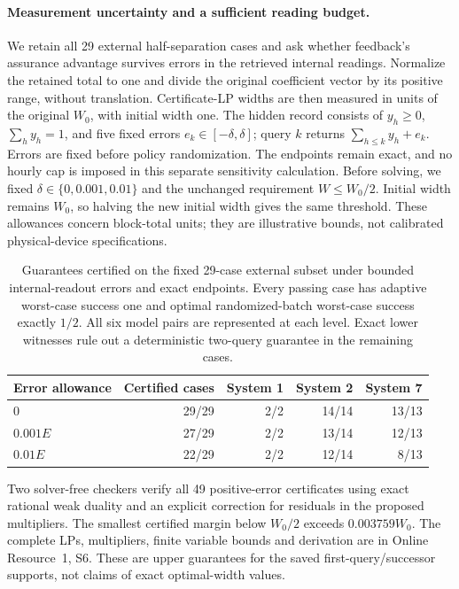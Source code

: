 \documentclass[12pt]{article}
\begin{document}
\FloatBarrier

\paragraph{Measurement uncertainty and a sufficient reading budget.}\label{sec:stored-error-sensitivity}
We retain all 29 external half-separation cases and ask whether feedback's
assurance advantage survives errors in the retrieved internal readings.
Normalize the retained total to one and divide the original coefficient
vector by its positive range, without translation. Certificate-LP widths
are then measured in units of the original $W_0$, with initial width one.
The hidden record consists of
$y_h\geq0$, $\sum_h y_h=1$, and five fixed errors
$e_k\in[-\delta,\delta]$; query $k$ returns
$\sum_{h\leq k}y_h+e_k$. Errors are fixed before policy randomization.
The endpoints remain exact, and no hourly cap is imposed in this separate
sensitivity calculation. Before solving, we fixed
$\delta\in\{0,0.001,0.01\}$ and the unchanged requirement $W\leq W_0/2$.
Initial width remains $W_0$, so halving the new initial width gives the
same threshold. These allowances concern block-total units; they are
illustrative bounds, not calibrated physical-device specifications.

\begin{table}[htbp]\centering\small
\caption{Guarantees certified on the fixed 29-case external subset under
bounded internal-readout errors and exact endpoints. Every passing case
has adaptive worst-case success one and optimal randomized-batch worst-case
success exactly $1/2$. All six model pairs are represented at each level.
Exact lower witnesses rule out a deterministic two-query guarantee in the
remaining cases.}
\label{tab:stored-error-certificates}
\begin{tabular}{lrrrr}\toprule
Error allowance & Certified cases & System 1 & System 2 & System 7\\\midrule
$0$ & 29/29 & 2/2 & 14/14 & 13/13\\
$0.001E$ & 27/29 & 2/2 & 13/14 & 12/13\\
$0.01E$ & 22/29 & 2/2 & 12/14 & 8/13\\\bottomrule
\end{tabular}\end{table}

Two solver-free checkers verify all 49 positive-error certificates using
exact rational weak duality and an explicit correction for residuals in
the proposed multipliers. The smallest certified margin below $W_0/2$
exceeds $0.003759W_0$. The complete LPs, multipliers, finite variable bounds
and derivation are in Online Resource~1, S6. These are upper guarantees
for the saved first-query/successor supports, not claims of exact
optimal-width values.
\end{document}
